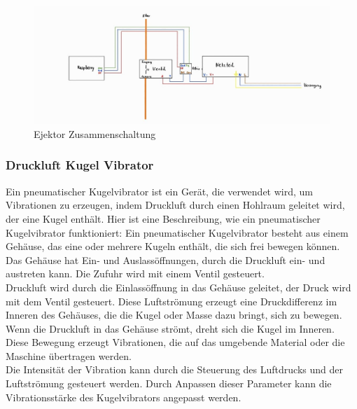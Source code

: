 \begin{figure}[H]
    \centering
    \includegraphics[scale=0.5]{image/vakummejektorzusammen.jpeg}
    \caption{Ejektor Zusammenschaltung}
    \label{fig:enter-label}
\end{figure}

\subsubsection{Druckluft Kugel Vibrator}
Ein pneumatischer Kugelvibrator ist ein Gerät, die verwendet wird, um Vibrationen zu erzeugen, indem Druckluft durch einen Hohlraum geleitet wird, der eine Kugel enthält. Hier ist eine Beschreibung, wie ein pneumatischer Kugelvibrator funktioniert:
Ein pneumatischer Kugelvibrator besteht aus einem Gehäuse, das eine oder mehrere Kugeln enthält, die sich frei bewegen können. Das Gehäuse hat Ein- und Auslassöffnungen, durch die Druckluft ein- und austreten kann. Die Zufuhr wird mit einem Ventil gesteuert.\\
Druckluft wird durch die Einlassöffnung in das Gehäuse geleitet, der Druck wird mit dem Ventil gesteuert. Diese Luftströmung erzeugt eine Druckdifferenz im Inneren des Gehäuses, die die Kugel oder Masse dazu bringt, sich zu bewegen.\\
\vspace{3mm}
Wenn die Druckluft in das Gehäuse strömt, dreht sich die Kugel im Inneren. Diese Bewegung erzeugt Vibrationen, die auf das umgebende Material oder die Maschine übertragen werden.\\
\vspace{3mm}
Die Intensität der Vibration kann durch die Steuerung des Luftdrucks und der Luftströmung gesteuert werden. Durch Anpassen dieser Parameter kann die Vibrationsstärke des Kugelvibrators angepasst werden.\\
\vspace{3mm}
